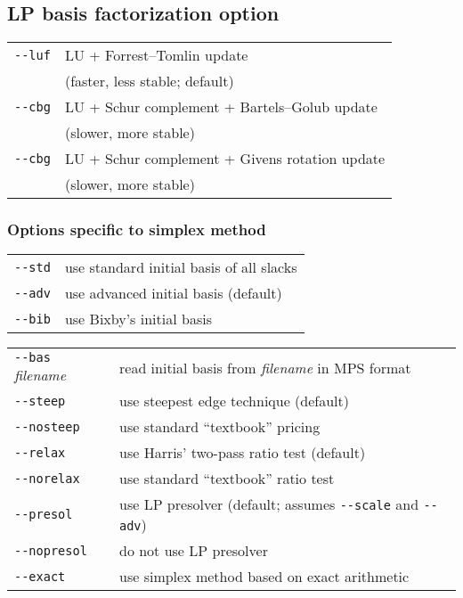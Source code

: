 \subsection*{LP basis factorization option}

\noindent
\begin{tabular}{@{}p{30mm}p{92.3mm}@{}}
\verb|--luf|      &  LU + Forrest--Tomlin update \\
                  &  (faster, less stable; default) \\
\verb|--cbg|      &  LU + Schur complement + Bartels--Golub update \\
                  &  (slower, more stable) \\
\verb|--cbg|      &  LU + Schur complement + Givens rotation update \\
                  &  (slower, more stable) \\
\end{tabular}

\subsubsection*{Options specific to simplex method}

\noindent
\begin{tabular}{@{}p{30mm}p{92.3mm}@{}}
\verb|--std|      &  use standard initial basis of all slacks \\
\verb|--adv|      &  use advanced initial basis (default) \\
\verb|--bib|      &  use Bixby's initial basis\\
\end{tabular}

\noindent
\begin{tabular}{@{}p{30mm}p{92.3mm}@{}}
\verb|--bas| {\it filename}
                  &  read initial basis from {\it filename} in MPS
                     format \\
\verb|--steep|    &  use steepest edge technique (default) \\
\verb|--nosteep|  &  use standard ``textbook'' pricing \\
\verb|--relax|    &  use Harris' two-pass ratio test (default) \\
\verb|--norelax|  &  use standard ``textbook'' ratio test \\
\verb|--presol|   &  use LP presolver (default; assumes \verb|--scale|
                     and \verb|--adv|) \\
\verb|--nopresol| &  do not use LP presolver \\
\verb|--exact|    & use simplex method based on exact arithmetic \\
\end{tabular}

